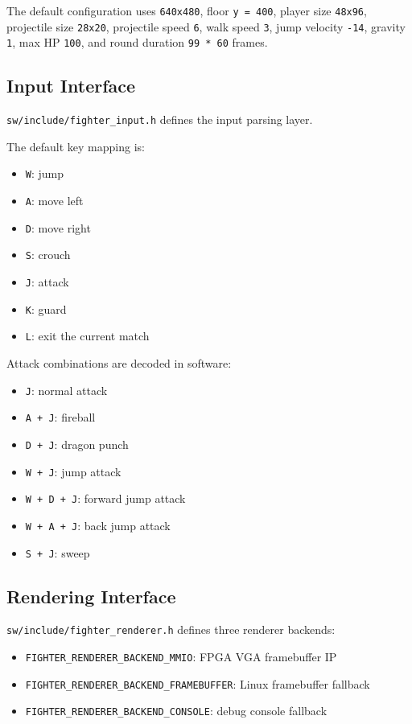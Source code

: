 \documentclass[12pt,a4paper]{article}
\begin{document}
The default configuration uses \texttt{640x480}, floor \texttt{y = 400},
player size \texttt{48x96}, projectile size \texttt{28x20}, projectile speed
\texttt{6}, walk speed \texttt{3}, jump velocity \texttt{-14}, gravity
\texttt{1}, max HP \texttt{100}, and round duration \texttt{99 * 60} frames.

\subsection{Input Interface}

\texttt{sw/include/fighter\_input.h} defines the input parsing layer.

The default key mapping is:

\begin{itemize}
  \item \texttt{W}: jump
  \item \texttt{A}: move left
  \item \texttt{D}: move right
  \item \texttt{S}: crouch
  \item \texttt{J}: attack
  \item \texttt{K}: guard
  \item \texttt{L}: exit the current match
\end{itemize}

Attack combinations are decoded in software:

\begin{itemize}
  \item \texttt{J}: normal attack
  \item \texttt{A + J}: fireball
  \item \texttt{D + J}: dragon punch
  \item \texttt{W + J}: jump attack
  \item \texttt{W + D + J}: forward jump attack
  \item \texttt{W + A + J}: back jump attack
  \item \texttt{S + J}: sweep
\end{itemize}

\subsection{Rendering Interface}

\texttt{sw/include/fighter\_renderer.h} defines three renderer backends:

\begin{itemize}
  \item \texttt{FIGHTER\_RENDERER\_BACKEND\_MMIO}: FPGA VGA framebuffer IP
  \item \texttt{FIGHTER\_RENDERER\_BACKEND\_FRAMEBUFFER}: Linux framebuffer fallback
  \item \texttt{FIGHTER\_RENDERER\_BACKEND\_CONSOLE}: debug console fallback
\end{itemize}
\end{document}
